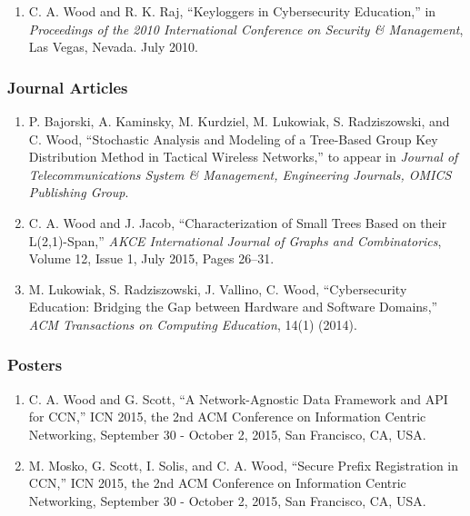 \documentclass[10pt]{res} %
\begin{document}
\begin{resume}
\begin{enumerate}[C-1.]
\item C. A. Wood and R. K. Raj, ``Keyloggers in Cybersecurity Education,'' in {\it Proceedings of the 2010 International Conference on Security \& Management}, Las Vegas, Nevada. July 2010.

\end{enumerate}

\vspace{-15pt}
\subsubsection*{Journal Articles}

\begin{enumerate}[J-1.]

\item P. Bajorski, A. Kaminsky, M. Kurdziel, M. Lukowiak, S. Radziszowski, and C. Wood, ``Stochastic Analysis and Modeling of a Tree-Based Group Key Distribution Method in Tactical Wireless Networks,'' to appear in {\it Journal of Telecommunications System \& Management, Engineering Journals, OMICS Publishing Group}.

\item C. A. Wood and J. Jacob, ``Characterization of Small Trees Based on their L(2,1)-Span,'' \emph{AKCE International Journal of Graphs and Combinatorics}, Volume 12, Issue 1, July 2015, Pages 26–31.

\item M. Lukowiak, S. Radziszowski, J. Vallino, C. Wood, ``Cybersecurity Education: Bridging the Gap between Hardware and Software Domains,'' {\it ACM Transactions on Computing Education}, 14(1) (2014).

\end{enumerate}

\vspace{-15pt}
\subsubsection*{Posters}
\begin{enumerate}[P-1.]
	\item C. A. Wood and G. Scott, ``A Network-Agnostic Data Framework and API for CCN,'' ICN 2015, the 2nd ACM Conference on Information Centric Networking, September 30 - October 2, 2015, San Francisco, CA, USA.

	\item M. Mosko, G. Scott, I. Solis, and C. A. Wood, ``Secure Prefix Registration in CCN,'' ICN 2015, the 2nd ACM Conference on Information Centric Networking, September 30 - October 2, 2015, San Francisco, CA, USA.
\end{enumerate}


\end{resume}
\end{document}
